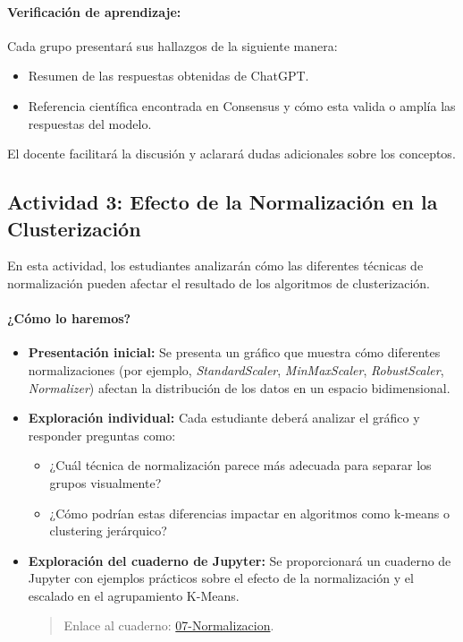 \documentclass[a4,11pt]{aleph-notas}
\begin{document}
\paragraph{Verificación de aprendizaje:}  
Cada grupo presentará sus hallazgos de la siguiente manera:
\begin{itemize}[leftmargin=*]
    \item Resumen de las respuestas obtenidas de ChatGPT.
    \item Referencia científica encontrada en Consensus y cómo esta valida o amplía las respuestas del modelo.
\end{itemize}
El docente facilitará la discusión y aclarará dudas adicionales sobre los conceptos.

\subsection*{Actividad 3: Efecto de la Normalización en la Clusterización}

En esta actividad, los estudiantes analizarán cómo las diferentes técnicas de normalización pueden afectar el resultado de los algoritmos de clusterización.

\paragraph{¿Cómo lo haremos?}  
\begin{itemize}[leftmargin=*]
    \item \textbf{Presentación inicial:}  
    Se presenta un gráfico que muestra cómo diferentes normalizaciones (por ejemplo, \textit{StandardScaler}, \textit{MinMaxScaler}, \textit{RobustScaler}, \textit{Normalizer}) afectan la distribución de los datos en un espacio bidimensional.
    
    \item \textbf{Exploración individual:}  
    Cada estudiante deberá analizar el gráfico y responder preguntas como:
    \begin{itemize}
        \item ¿Cuál técnica de normalización parece más adecuada para separar los grupos visualmente?
        \item ¿Cómo podrían estas diferencias impactar en algoritmos como k-means o clustering jerárquico?
    \end{itemize}

     \item \textbf{Exploración del cuaderno de Jupyter:}  
        Se proporcionará un cuaderno de Jupyter con ejemplos prácticos sobre el efecto de la normalización y el escalado en el agrupamiento K-Means.
    \begin{quote}
        Enlace al cuaderno: \href{https://colab.research.google.com/github/andres-merino/AprendizajeAutomaticoInicial-05-N0105/blob/main/2-Notebooks/07-Normalizacion.ipynb}{07-Normalizacion}.
    \end{quote}

\end{itemize}
\end{document}
